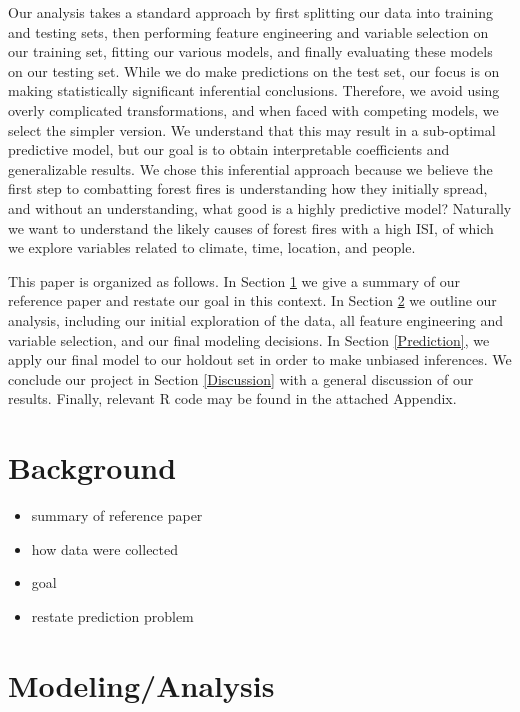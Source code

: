 \documentclass{article}
\begin{document}
Our analysis takes a standard approach by first splitting our data into training and testing sets, then performing feature engineering and variable selection on our training set, fitting our various models, and finally evaluating these models on our testing set. While we do make predictions on the test set, our focus is on making statistically significant inferential conclusions. Therefore, we avoid using overly complicated transformations, and when faced with competing models, we select the simpler version. We understand that this may result in a sub-optimal predictive model, but our goal is to obtain interpretable coefficients and generalizable results. We chose this inferential approach because we believe the first step to combatting forest fires is understanding how they initially spread, and without an understanding, what good is a highly predictive model? Naturally we want to understand the likely causes of forest fires with a high ISI, of which we explore variables related to climate, time, location, and people.

This paper is organized as follows. In Section \ref{Background} we give a summary of our reference paper and restate our goal in this context. In Section \ref{Analysis} we outline our analysis, including our initial exploration of the data, all feature engineering and variable selection, and our final modeling decisions. In Section \ref{Prediction}, we apply our final model to our holdout set in order to make unbiased inferences. We conclude our project in Section \ref{Discussion} with a general discussion of our results. Finally, relevant R code may be found in the attached Appendix.

\section{Background}\label{Background}

\begin{itemize}

\item summary of reference paper
\item how data were collected
\item goal
\item restate prediction problem

\end{itemize}

\section{Modeling/Analysis}\label{Analysis}
\end{document}
